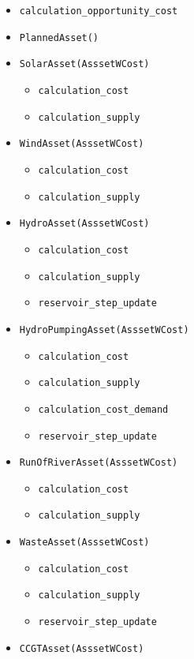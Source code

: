 \begin{itemize}
\item \texttt{calculation\_opportunity\_cost}
\item \texttt{PlannedAsset()}
\item \texttt{SolarAsset(AsssetWCost)}
	\begin{itemize}
	\item \texttt{calculation\_cost}
	\item \texttt{calculation\_supply}
	\end{itemize}
\item \texttt{WindAsset(AsssetWCost)}
	\begin{itemize}
	\item \texttt{calculation\_cost}
	\item \texttt{calculation\_supply}
	\end{itemize}
\item \texttt{HydroAsset(AsssetWCost)}
	\begin{itemize}
	\item \texttt{calculation\_cost}
	\item \texttt{calculation\_supply}
	\item \texttt{reservoir\_step\_update}
	\end{itemize}
\item \texttt{HydroPumpingAsset(AsssetWCost)}
	\begin{itemize}
	\item \texttt{calculation\_cost}
	\item \texttt{calculation\_supply}
	\item \texttt{calculation\_cost\_demand}
	\item \texttt{reservoir\_step\_update}
	\end{itemize}
\item \texttt{RunOfRiverAsset(AsssetWCost)}
	\begin{itemize}
	\item \texttt{calculation\_cost}
	\item \texttt{calculation\_supply}
	\end{itemize}
\item \texttt{WasteAsset(AsssetWCost)}
	\begin{itemize}
	\item \texttt{calculation\_cost}
	\item \texttt{calculation\_supply}
	\item \texttt{reservoir\_step\_update}
	\end{itemize}
\item \texttt{CCGTAsset(AsssetWCost)}

\end{itemize}
